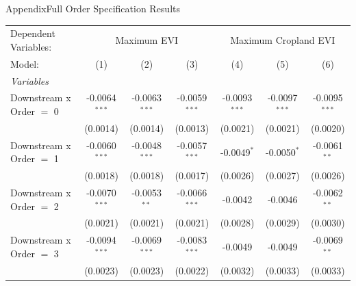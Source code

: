 \documentclass[aspectratio=169,11pt,dvipsnames, handout]{beamer}
\begin{document}
\begin{frame}{\textcolor{defaultclr!30}{Appendix}\hspace{0.75em}Full Order Specification Results}
\label{frame:orderfull}
 \centering

\begin{adjustbox}{width=0.45\textwidth, center}
   \begin{tabular}{lcccccc}\label{tab:app_main_order}
      \tabularnewline \midrule \midrule
      Dependent Variables: & \multicolumn{3}{c}{Maximum EVI} & \multicolumn{3}{c}{Maximum Cropland EVI}\\
      Model:                    & (1)             & (2)                     & (3)                            & (4)             & (5)                           & (6)\\  
      \midrule
      \emph{Variables}\\
      Downstream x Order $=$ 0  & -0.0064$^{***}$ & -0.0063$^{***}$         & -0.0059$^{***}$                & -0.0093$^{***}$ & -0.0097$^{***}$               & -0.0095$^{***}$\\   
                                & (0.0014)        & (0.0014)                & (0.0013)                       & (0.0021)        & (0.0021)                      & (0.0020)\\   
      Downstream x Order $=$ 1  & -0.0060$^{***}$ & -0.0048$^{***}$         & -0.0057$^{***}$                & -0.0049$^{*}$   & -0.0050$^{*}$                 & -0.0061$^{**}$\\   
                                & (0.0018)        & (0.0018)                & (0.0017)                       & (0.0026)        & (0.0027)                      & (0.0026)\\   
      Downstream x Order $=$ 2  & -0.0070$^{***}$ & -0.0053$^{**}$          & -0.0066$^{***}$                & -0.0042         & -0.0046                       & -0.0062$^{**}$\\   
                                & (0.0021)        & (0.0021)                & (0.0021)                       & (0.0028)        & (0.0029)                      & (0.0030)\\   
      Downstream x Order $=$ 3  & -0.0094$^{***}$ & -0.0069$^{***}$         & -0.0083$^{***}$                & -0.0049         & -0.0049                       & -0.0069$^{**}$\\   
                                & (0.0023)        & (0.0023)                & (0.0022)                       & (0.0032)        & (0.0033)                      & (0.0033)\\   

\end{tabular}
\end{adjustbox}
\end{frame}
\end{document}
